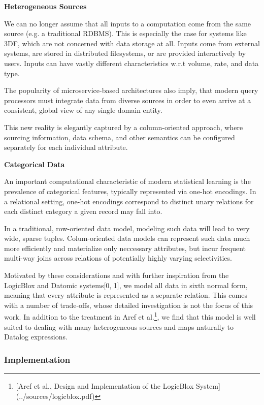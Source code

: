 \documentclass[../index.tex]{subfiles}
\begin{document}
\textbf{Heterogeneous Sources}

We can no longer assume that all inputs to a computation come from the
same source (e.g. a traditional RDBMS). This is especially the case
for systems like 3DF, which are not concerned with data storage at
all. Inputs come from external systems, are stored in distributed
filesystems, or are provided interactively by users. Inputs can have
vastly different characteristics w.r.t volume, rate, and data type.

The popularity of microservice-based architectures also imply, that
modern query processors must integrate data from diverse sources in
order to even arrive at a consistent, global view of any single domain
entity.

This new reality is elegantly captured by a column-oriented approach,
where sourcing information, data schema, and other semantics can be
configured separately for each individual attribute.

\textbf{Categorical Data}

An important computational characteristic of modern statistical
learning is the prevalence of categorical features, typically
represented via one-hot encodings. In a relational setting, one-hot
encodings correspond to distinct unary relations for each distinct
category a given record may fall into.

In a traditional, row-oriented data model, modeling such data will
lead to very wide, sparse tuples. Colum-oriented data models can
represent such data much more efficiently and materialize only
neccessary attributes, but incur frequent multi-way joins across
relations of potentially highly varying selectivities.

Motivated by these considerations and with further inspiration from
the LogicBlox and Datomic systems[0, 1], we model all data in sixth
normal form, meaning that every attribute is represented as a separate
relation. This comes with a number of trade-offs, whose detailed
investigation is not the focus of this work. In addition to the
treatment in Aref et al.\footnote{[Aref et al., Design and Implementation of the LogicBlox System](../sources/logicblox.pdf)}, we find that this model is well suited to
dealing with many heterogeneous sources and maps naturally to Datalog
expressions.

\subsubsection{Implementation}
\end{document}

